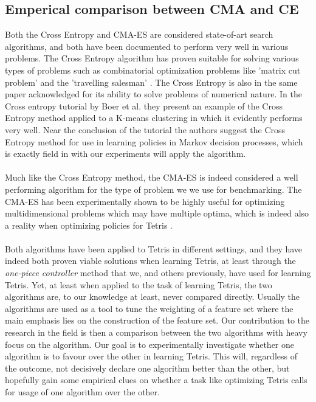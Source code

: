 \subsection{Emperical comparison between CMA and CE}

Both the Cross Entropy and CMA-ES are considered state-of-art
search algorithms, and both have been documented to perform very well
in various problems. The Cross Entropy algorithm has proven 
suitable for solving various types of problems such as 
combinatorial optimization problems like 'matrix cut problem'
and the 'travelling salesman' \citep{cetut2014}. 
The Cross Entropy is also in the same paper acknowledged for
its ability to solve problems of numerical nature. In the 
Cross entropy tutorial by Boer et al. they present 
an example of the Cross Entropy method applied to 
a K-means clustering in which it evidently performs very well.
Near the conclusion of the tutorial the authors suggest the 
Cross Entropy method for use in learning policies in Markov decision 
processes, which is exactly field in with our experiments will apply the
algorithm.\\
\\
Much like the Cross Entropy method, the CMA-ES is indeed considered
a well performing algorithm for the type of problem we we use for benchmarking.
The CMA-ES has been experimentally shown to be highly useful for optimizing multidimensional
problems which may have multiple optima, which is indeed also a reality when 
optimizing policies for Tetris \citep{hansen2004}.\\
\\
Both algorithms have been applied to Tetris in different settings, and they have
indeed both proven viable solutions when learning Tetris, at least through the
\textit{one-piece controller} method that we, and others previously, have used
for learning Tetris. Yet, at least when applied to the task of learning Tetris,
the two algorithms are, to our knowledge at least, never compared directly. Usually
the algorithms are used as a tool to tune the weighting of a feature set where the
main emphasis lies on the construction of the feature set. Our contribution to 
the research in the field is then a comparison between the two algorithms
with heavy focus on the algorithm. Our goal is to experimentally investigate
whether one algorithm is to favour over the other in learning Tetris.
This will, regardless of the outcome, not decisively declare one algorithm 
better than the other, but hopefully gain some empirical clues on whether 
a task like optimizing Tetris calls for usage of one algorithm over the other.
